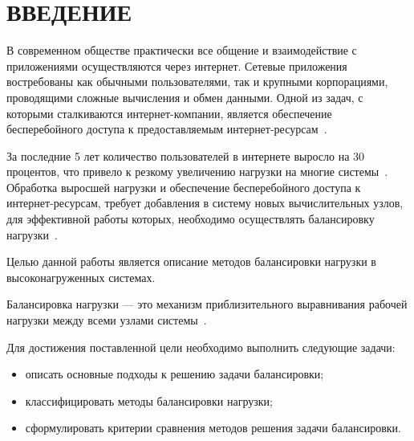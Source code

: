 \chapter*{ВВЕДЕНИЕ}

В современном обществе практически все общение и взаимодействие с приложениями осуществляются через интернет. 
Сетевые приложения востребованы как обычными пользователями, так и крупными корпорациями, проводящими сложные вычисления и обмен данными.
Одной из задач, с которыми сталкиваются интернет-компании, является обеспечение бесперебойного доступа к предоставляемым интернет-ресурсам~\cite{webact}.

За последние 5 лет количество пользователей в интернете выросло на 30 процентов, что привело к резкому увеличению нагрузки на многие системы~\cite{statistics}. Обработка выросшей нагрузки и обеспечение бесперебойного доступа к интернет-ресурсам, требует добавления в систему новых вычислительных узлов, для эффективной работы которых, необходимо осуществлять балансировку нагрузки~\cite{strategies, com_analysis, gaud, part_algos}.

Целью данной работы является описание методов балансировки нагрузки в высоконагруженных системах.

Балансировка нагрузки --- это механизм приблизительного выравнивания рабочей нагрузки между всеми узлами системы~\cite{anal}.

Для достижения поставленной цели необходимо выполнить следующие
задачи:
\begin{itemize}
	\item описать основные подходы к решению задачи балансировки;
	\item классифицировать методы балансировки нагрузки;
	\item сформулировать критерии сравнения методов решения задачи балансировки.
\end{itemize}

